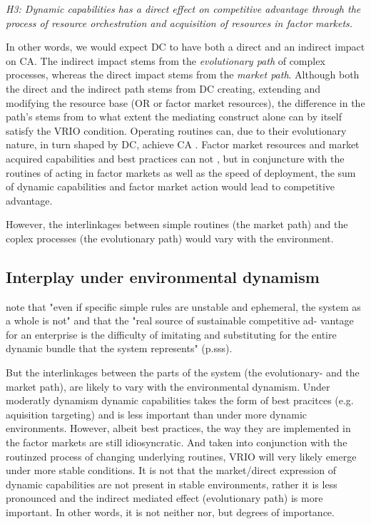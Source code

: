 \documentclass[review,fleqn]{elsarticle}\usepackage[]{graphicx}\usepackage[]{color}
\begin{document}
\emph{H3: Dynamic capabilities has a direct effect on competitive advantage through the
  process of resource orchestration and acquisition of resources in factor markets.}

In other words, we would expect DC to have both a direct and an indirect impact on CA. The
indirect impact stems from the \emph{evolutionary path} of complex processes, whereas the
direct impact stems from the \emph{market path}.  Although both the direct and the
indirect path stems from DC creating, extending and modifying the resource base (OR or
factor market resources), the difference in the path’s stems from to what extent the
mediating construct alone can by itself satisfy the VRIO condition. Operating routines
can, due to their evolutionary nature, in turn shaped by DC, achieve CA
\citep{Collis1994,Winter2003}. Factor market resources and market acquired capabilities
and best practices can not \citep{Eisenhardt2000,Peteraf2013}, but in conjuncture with the
routines of acting in factor markets as well as the speed of deployment, the sum of
dynamic capabilities and factor market action would lead to competitive advantage.

However, the interlinkages between simple routines (the market path) and the coplex
processes (the evolutionary path) would vary with the environment.

\subsection{Interplay under environmental dynamism}

\cite{DiStefano2014} note that "even if specific simple rules are unstable and ephemeral,
the system as a whole is not" and that the "real source of sustainable competitive ad- vantage for an enterprise is the difficulty of imitating and substituting for the entire dynamic bundle that the system represents" (p.sss).

But the interlinkages between the parts of the system (the evolutionary- and the market
path), are likely to vary with the environmental dynamism. Under moderatly dynamism
dynamic capabilities takes the form of best pracitces (e.g. aquisition targeting) and is
less important than under more dynamic environments. However, albeit best practices, the
way they are implemented in the factor markets are still idiosyncratic. And taken into
conjunction with the routinzed process of changing underlying routines, VRIO will very
likely emerge under more stable conditions. It is not that the market/direct expression
of dynamic capabilities are not present in stable environments, rather it is less pronounced and the indirect
mediated effect (evolutionary path) is more important. In other words, it is not neither
nor, but degrees of importance.
\end{document}
